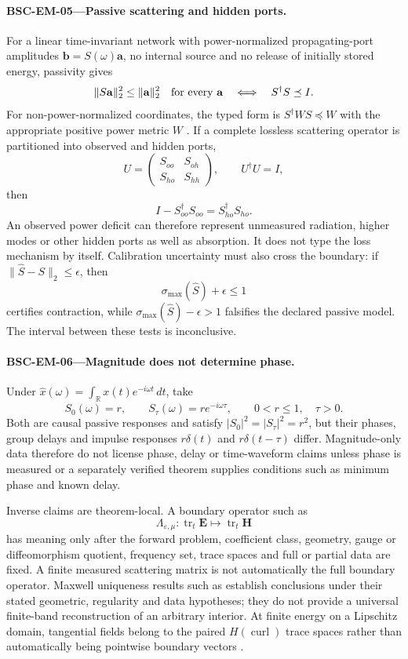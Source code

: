 \documentclass[11pt,a4paper]{article}
\theoremstyle{definition}
\theoremstyle{plain}
\theoremstyle{remark}
\begin{document}
\paragraph{\textbf{BSC-EM-05}---Passive scattering and hidden ports.}
For a linear time-invariant network with power-normalized propagating-port
amplitudes \(\mathbf b=S(\omega)\mathbf a\), no internal source and no release
of initially stored energy, passivity gives
\[
\|S\mathbf a\|_2^2\leq\|\mathbf a\|_2^2
\quad\hbox{for every \(\mathbf a\)}
\quad\Longleftrightarrow\quad
S^\dagger S\preceq I .
\]
For non-power-normalized coordinates, the typed form is
\(S^\dagger W S\preceq W\) with the appropriate positive power metric
\(W\) \citep{kurokawa1965,markswilliams1992}.  If a complete lossless
scattering operator is partitioned into observed and hidden ports,
\[
U=
\begin{pmatrix}
S_{oo}&S_{oh}\\
S_{ho}&S_{hh}
\end{pmatrix},
\qquad U^\dagger U=I,
\]
then
\[
I-S_{oo}^\dagger S_{oo}=S_{ho}^\dagger S_{ho}.
\]
An observed power deficit can therefore represent unmeasured radiation,
higher modes or other hidden ports as well as absorption.  It does not type
the loss mechanism by itself.  Calibration uncertainty must also cross the
boundary: if
\(\|\widehat S-S\|_2\leq\epsilon\), then
\[
\sigma_{\max}(\widehat S)+\epsilon\leq1
\]
certifies contraction, while
\(\sigma_{\max}(\widehat S)-\epsilon>1\) falsifies the declared passive
model.  The interval between these tests is inconclusive.

\paragraph{\textbf{BSC-EM-06}---Magnitude does not determine phase.}
Under
\(\widehat x(\omega)=\int_{\mathbb R}x(t)e^{-i\omega t}\,dt\), take
\[
S_0(\omega)=r,
\qquad
S_\tau(\omega)=r e^{-i\omega\tau},
\qquad
0<r\leq1,\quad\tau>0.
\]
Both are causal passive responses and satisfy
\(\lvert S_0\rvert^2=\lvert S_\tau\rvert^2=r^2\), but their phases, group
delays and impulse responses \(r\delta(t)\) and
\(r\delta(t-\tau)\) differ.  Magnitude-only data therefore do not license
phase, delay or time-waveform claims unless phase is measured or a separately
verified theorem supplies conditions such as minimum phase and known delay.

Inverse claims are theorem-local.  A boundary operator such as
\[
\Lambda_{\varepsilon,\mu}:
\operatorname{tr}_t\mathbf E\longmapsto
\operatorname{tr}_t\mathbf H
\]
has meaning only after the forward problem, coefficient class, geometry,
gauge or diffeomorphism quotient, frequency set, trace spaces and full or
partial data are fixed.  A finite measured scattering matrix is not
automatically the full boundary operator.  Maxwell uniqueness results such
as \citet{kenigsalouhlmann2011} establish conclusions under their stated
geometric, regularity and data hypotheses; they do not provide a universal
finite-band reconstruction of an arbitrary interior.  At finite energy on a
Lipschitz domain, tangential fields belong to the paired
\(H(\operatorname{curl})\) trace spaces rather than automatically being
pointwise boundary vectors \citep{buffacostabelsheen2002}.
\end{document}
